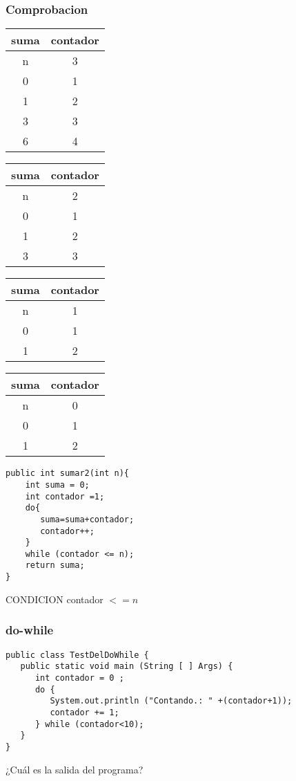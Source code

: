\documentclass{beamer}
\begin{document}
\begin{frame}[fragile]
\frametitle{Comprobacion}
\begin{footnotesize}
\begin{multicols}{2}
\begin{tabular}{|c|c|}
\hline
suma & contador\\
\hline
\alert{n}&\alert{3}\\
\hline
0 & 1\\
\hline
1 & 2\\
\hline
3 & 3\\
\hline
6 & 4\\
\hline
\end{tabular}
\begin{tabular}{|c|c|}
\hline
suma & contador\\
\hline
\alert{n}&\alert{2}\\
\hline
0 & 1\\
\hline
1 & 2\\
\hline
3 & 3\\
\hline
\end{tabular}
\begin{tabular}{|c|c|}
\hline
suma & contador\\
\hline
\alert{n}&\alert{1}\\
\hline
0 & 1\\
\hline
1 & 2\\
\hline
\end{tabular}

\begin{tabular}{|c|c|}
\hline
suma & contador\\
\hline
\alert{n}&\alert{0}\\
\hline
0 & 1\\
\hline
1 & 2\\
\hline
\end{tabular}
\begin{verbatim}
public int sumar2(int n){
    int suma = 0;
    int contador =1;
    do{
       suma=suma+contador;
       contador++;
    }
    while (contador <= n);
    return suma;
}
\end{verbatim}
\end{multicols}
\end{footnotesize}
\begin{center}
\alert{CONDICION contador $<=n$}
\end{center}
\end{frame}


\begin{frame}[fragile]
\frametitle{do-while}
\begin{verbatim}
public class TestDelDoWhile {
   public static void main (String [ ] Args) {
      int contador = 0 ;
      do {
         System.out.println ("Contando.: " +(contador+1));
         contador += 1;
      } while (contador<10);
   }   
}
\end{verbatim}
¿Cuál es la salida del programa?
\end{frame}
\end{document}
